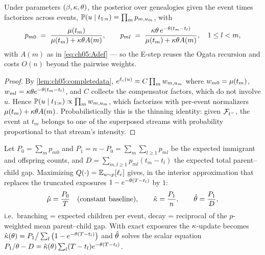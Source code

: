 \begin{proposition}\label{prop:ch05:estep}
Under parameters $(\beta,\kappa,\theta)$, the posterior over genealogies
given the event times factorizes across events,
$\mathbb{P}(u \mid t_{1:n}) = \prod_m p_{m,u_m}$, with
\begin{equation}\label{eq:ch05:estep}
p_{m0} \;=\; \frac{\mu(t_m)}{\mu(t_m) + \kappa\theta A(m)},
\qquad
p_{ml} \;=\; \frac{\kappa\theta\, e^{-\theta(t_m - t_l)}}
{\mu(t_m) + \kappa\theta A(m)},
\quad 1 \le l < m,
\end{equation}
with $A(m)$ as in \cref{eq:ch05:Adef} --- so the E-step reuses the Ogata
recursion and costs $O(n)$ beyond the pairwise weights.
\end{proposition}

\begin{proof}
By \cref{lem:ch05:completedata}, $e^{\ell_c(u)} = C \prod_m w_{m,u_m}$
where $w_{m0} = \mu(t_m)$, $w_{ml} = \kappa\theta e^{-\theta(t_m-t_l)}$,
and $C$ collects the compensator factors, which do not involve $u$. Hence
$\mathbb{P}(u \mid t_{1:n}) \propto \prod_m w_{m,u_m}$, which factorizes with
per-event normalizers $\mu(t_m) + \kappa\theta A(m)$. Probabilistically
this is the thinning identity: given $\mathcal{F}_{t^-}$, the event at $t_m$ belongs to
one of the superposed streams with probability proportional to that
stream's intensity.
\end{proof}

\begin{proposition}[M-step]\label{prop:ch05:mstep}
Let $P_0 = \sum_m p_{m0}$ and $P_1 = n - P_0 = \sum_m \sum_{l\ge1} p_{ml}$
be the expected immigrant and offspring counts, and $D = \sum_{m,l\ge1}
p_{ml}(t_m - t_l)$ the expected total parent--child gap. Maximizing
$Q(\cdot) = \mathbb{E}_{u \sim p}[\ell_c]$ gives, in the interior approximation
that replaces the truncated exposures $1 - e^{-\theta(T-t_l)}$ by $1$:
\begin{equation}\label{eq:ch05:mstep}
\hat{\mu} = \frac{P_0}{T} \quad (\text{constant baseline}),
\qquad
\hat{\kappa} = \frac{P_1}{n},
\qquad
\hat{\theta} = \frac{P_1}{D},
\end{equation}
i.e.\ branching = expected children per event, decay = reciprocal of the
$p$-weighted mean parent--child gap. With exact exposures the
$\kappa$-update becomes $\hat{\kappa}(\theta) = P_1 \big/ \sum_l
\big(1-e^{-\theta(T-t_l)}\big)$ and $\hat{\theta}$ solves the scalar
equation $P_1/\theta - D = \hat{\kappa}(\theta)\sum_l (T -
t_l)e^{-\theta(T-t_l)}$.
\end{proposition}

